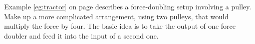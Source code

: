 Example \ref{eg:tractor} on page \pageref{eg:tractor} describes a force-doubling
setup involving a pulley. Make up a more complicated
arrangement, using two pulleys, that would multiply
the force by four. The basic idea is to take the output
of one force doubler and feed it into the input of a second one.
